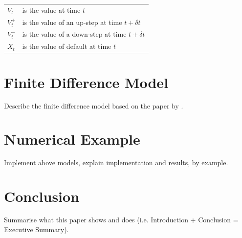 \documentclass[a4paper,11pt,oneside]{report}
\newcommand{\setlinespacing}[1]
           {\renewcommand{\baselinestretch}{#1}\small\normalsize}
\theoremstyle{plain}
\theoremstyle{definition}
\def\Dt{\ensuremath{\delta t}\xspace}
\begin{document}
\begin{tabular}{ll}
 $V_t$          & is the value at time $t$ \\
 $V^+_t$        & is the value of an up-step at time $t + \Dt$ \\
 $V^-_t$        & is the value of a down-step at time $t + \Dt$ \\
 $X_t$          & is the value of default at time $t$ \\
\end{tabular}

\chapter{Finite Difference Model}
Describe the finite difference model based on the paper by \citet{AFV03}.

\chapter{Numerical Example}
Implement above models, explain implementation and results, by example.

\chapter{Conclusion}
Summarise what this paper shows and does (i.e. Introduction + Conclusion = Executive Summary).


\clearpage
\setlinespacing{1}


\end{document}
